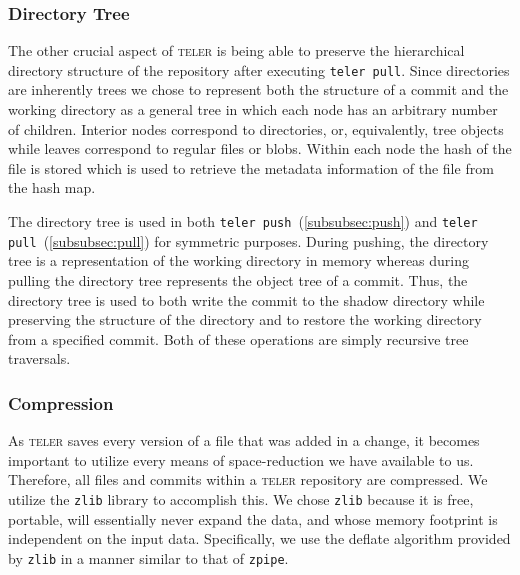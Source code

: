 \documentclass[12pt, letterpaper]{article}
\begin{document}
\begin{multicols}{2}
  \subsubsection{Directory Tree}
  \label{subsubsec:tree}

  The other crucial aspect of \textsc{teler} is being able to preserve
  the hierarchical directory structure of the repository after
  executing \texttt{teler pull}. Since directories are inherently
  trees we chose to represent both the structure of a commit and the
  working directory as a general tree in which each node has an
  arbitrary number of children. Interior nodes correspond to
  directories, or, equivalently, tree objects while leaves correspond
  to regular files or blobs. Within each node the hash of the file is
  stored which is used to retrieve the metadata information of the
  file from the hash map.

  The directory tree is used in both \texttt{teler
    push}~(\ref{subsubsec:push}) and \texttt{teler
    pull}~(\ref{subsubsec:pull}) for symmetric purposes. During
  pushing, the directory tree is a representation of the working
  directory in memory whereas during pulling the directory tree
  represents the object tree of a commit. Thus, the directory tree is
  used to both write the commit to the shadow directory while
  preserving the structure of the directory and to restore the working
  directory from a specified commit. Both of these operations are
  simply recursive tree traversals.


  \subsubsection{Compression}
  \label{subsec:compression}

  As \textsc{teler} saves every version of a file that was added in a
  change, it becomes important to utilize every means of
  space-reduction we have available to us. Therefore, all files and
  commits within a \textsc{teler} repository are compressed. We
  utilize the \texttt{zlib} library to accomplish this. We chose
  \texttt{zlib} because it is free, portable, will essentially never
  expand the data, and whose memory footprint is independent on the
  input data. Specifically, we use the deflate algorithm provided by
  \texttt{zlib} in a manner similar to that of \texttt{zpipe}.


\end{multicols}
\end{document}
